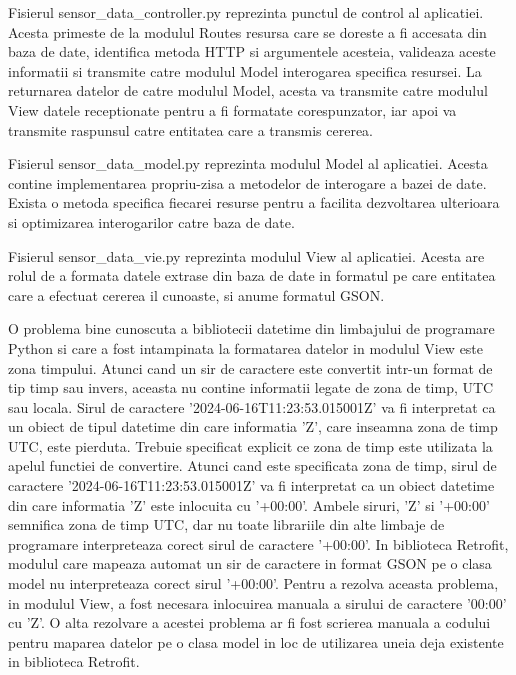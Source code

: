 Fisierul sensor\_data\_controller.py reprezinta punctul de control al aplicatiei. Acesta primeste de la modulul Routes resursa care se doreste a fi accesata din baza de date, 
identifica metoda HTTP si argumentele acesteia, valideaza aceste informatii si transmite catre modulul Model interogarea specifica resursei. La returnarea datelor de catre 
modulul Model, acesta va transmite catre modulul View datele receptionate pentru a fi formatate corespunzator, iar apoi va transmite raspunsul catre entitatea care a transmis 
cererea.

Fisierul sensor\_data\_model.py reprezinta modulul Model al aplicatiei. Acesta contine implementarea propriu-zisa a metodelor de interogare a bazei de date. Exista o metoda 
specifica fiecarei resurse pentru a facilita dezvoltarea ulterioara si optimizarea interogarilor catre baza de date.

Fisierul sensor\_data\_vie.py reprezinta modulul View al aplicatiei. Acesta are rolul de a formata datele extrase din baza de date in formatul pe care entitatea care a 
efectuat cererea il cunoaste, si anume formatul GSON. 

O problema bine cunoscuta a bibliotecii datetime din limbajului de programare Python si care a fost intampinata la formatarea datelor in modulul View este zona timpului. 
Atunci cand un sir de caractere este convertit intr-un format de tip timp sau invers, aceasta nu contine informatii legate de zona de timp, UTC sau locala. Sirul de caractere 
'2024-06-16T11:23:53.015001Z' va fi interpretat ca un obiect de tipul datetime din care informatia 'Z', care inseamna zona de timp UTC, este pierduta. 
Trebuie specificat explicit ce zona de timp este utilizata la apelul functiei de convertire. Atunci cand este specificata zona de timp, sirul de caractere 
'2024-06-16T11:23:53.015001Z' va fi interpretat ca un obiect datetime din care informatia 'Z' este inlocuita cu '+00:00'. Ambele siruri, 'Z' si '+00:00' semnifica zona de timp 
UTC, dar nu toate librariile din alte limbaje de programare interpreteaza corect sirul de caractere '+00:00'. In biblioteca Retrofit, modulul care mapeaza automat un sir de 
caractere in format GSON pe o clasa model nu interpreteaza corect sirul '+00:00'. Pentru a rezolva aceasta problema, in modulul View, a fost necesara inlocuirea manuala a sirului 
de caractere '00:00' cu 'Z'. O alta rezolvare a acestei problema ar fi fost scrierea manuala a codului pentru maparea datelor pe o clasa model in loc de utilizarea uneia deja 
existente in biblioteca Retrofit. 

